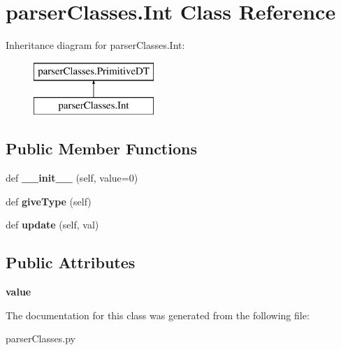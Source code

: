 \hypertarget{classparser_classes_1_1_int}{}\section{parser\+Classes.\+Int Class Reference}
\label{classparser_classes_1_1_int}
Inheritance diagram for parser\+Classes.\+Int\+:\begin{figure}[H]
\begin{center}
\leavevmode
\includegraphics[height=2.000000cm]{classparser_classes_1_1_int}
\end{center}
\end{figure}
\subsection*{Public Member Functions}
\begin{DoxyCompactItemize}
\item 
\mbox{\label{classparser_classes_1_1_int_a5f3c93887c93af55258fd75d55f79120}} 
def {\bfseries \+\_\+\+\_\+init\+\_\+\+\_\+} (self, value=0)
\item 
\mbox{\label{classparser_classes_1_1_int_afb7baec715a32b42a3365226fd95e8d1}} 
def {\bfseries give\+Type} (self)
\item 
\mbox{\label{classparser_classes_1_1_int_a0d695c67593f926a8336ba1b3222f9c8}} 
def {\bfseries update} (self, val)
\end{DoxyCompactItemize}
\subsection*{Public Attributes}
\begin{DoxyCompactItemize}
\item 
\mbox{\label{classparser_classes_1_1_int_a3daf0c4b136a333cb9f496272fffd119}} 
{\bfseries value}
\end{DoxyCompactItemize}


The documentation for this class was generated from the following file\+:\begin{DoxyCompactItemize}
\item 
parser\+Classes.\+py\end{DoxyCompactItemize}
